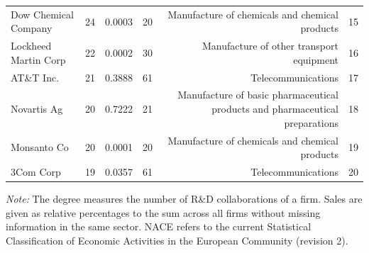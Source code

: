 \begin{table}[tbp]
{\begin{sideways}
\begin{threeparttable}
\begin{tabular}{lrrrrr}
Dow Chemical Company  & 24 & 0.0003 & 20 & Manufacture of chemicals and chemical products & 15 \\ 
Lockheed Martin Corp & 22 & 0.0002 & 30 & Manufacture of other transport equipment & 16 \\ 
AT\&T Inc. & 21 & 0.3888 & 61 & Telecommunications & 17 \\ 
Novartis Ag & 20 & 0.7222 & 21 & Manufacture of basic pharmaceutical products and pharmaceutical preparations & 18 \\ 
Monsanto Co & 20 & 0.0001 & 20 & Manufacture of chemicals and chemical products & 19 \\ 
3Com Corp & 19 & 0.0357 & 61 & Telecommunications & 20 \\ 
\midrule
\bottomrule
    \end{tabular}%
        \begin{tablenotes}[flushleft]%
	\item \emph{Note:} The degree measures the number of R\&D collaborations of a firm. Sales are given as relative percentages to the sum across all firms without missing information in the same sector. NACE refers to the current Statistical Classification of Economic Activities in the European Community (revision 2).
	\end{tablenotes}
  \label{tab:2000_deg_ranking-nace}%
\end{threeparttable}
\end{sideways}
}
\end{table}

